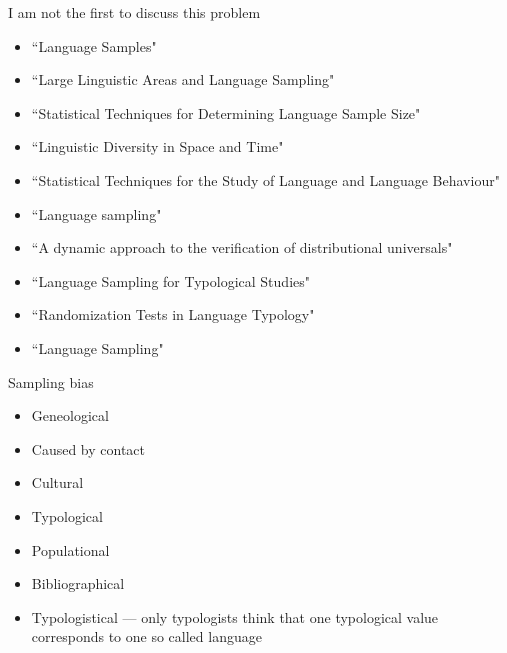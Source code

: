 \documentclass[13pt, t]{beamer}
\begin{document}
\begin{frame}{I am not the first to discuss this problem}
\begin{itemize}
\item \citep{bell78} ``Language Samples"
\item \citep{dryer89} ``Large Linguistic Areas and Language Sampling"
\item \citep{perkins89} ``Statistical Techniques for Determining Language Sample Size"
\item \citep{nichols92} ``Linguistic Diversity in Space and Time"
\item \citep{rietveld93} ``Statistical Techniques for the Study of Language and Language Behaviour"
\item \citep{rijkhoff98} ``Language sampling"
\item \citep{maslova00} ``A dynamic approach to the verification of distributional universals"
\item \citep{widmann01} ``Language Sampling for Typological Studies"
\item \citep{janssen06} ``Randomization Tests in Language Typology"
\item \citep{bakker10} ``Language Sampling"
\end{itemize}
\end{frame}

\begin{frame}{Sampling bias}
\begin{itemize}
\item Geneological
\item Caused by contact
\item Cultural
\item Typological
\item Populational \pause
\item \Large \alert{Bibliographical} \pause
\item \LARGE \alert{Typologistical} --- only typologists think that one typological value corresponds to one so called language
\end{itemize}
\end{frame}
\end{document}

